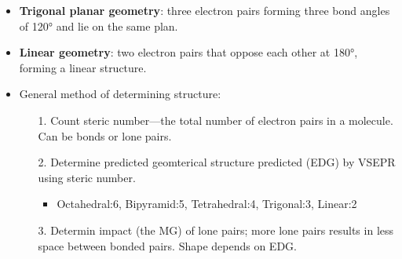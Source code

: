 \documentclass[12pt,a4paper]{article}
\begin{document}
\begin{itemize}
    \item \textbf{Trigonal planar geometry}: three electron pairs forming three bond angles of \ang{120} and lie on the same plan. 
    \item \textbf{Linear geometry}: two electron pairs that oppose each other at \ang{180}, forming a linear structure.
    \item General method of determining structure:
    \begin{itemize}
        \item[1.] Count steric number---the total number of electron pairs in a molecule. Can be bonds or lone pairs.
        \item[2.] Determine predicted geomterical structure predicted (EDG) by VSEPR using steric number.
            \begin{itemize}
                \item Octahedral:6, Bipyramid:5, Tetrahedral:4, Trigonal:3, Linear:2
            \end{itemize}
        \item[3.] Determin impact (the MG) of lone pairs; more lone pairs results in less space between bonded pairs. Shape depends on EDG.
    \end{itemize} 
\end{itemize}
\end{document}
